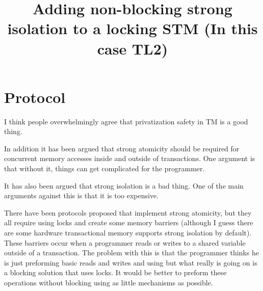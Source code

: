 \documentclass[11pt]{article}
\begin{document}
\newenvironment{theorem-repeat}[1]{\begin{trivlist}
\item[\hspace{\labelsep}{\bf\noindent Theorem~\ref{#1} }]}%
{\end{trivlist}}

\newenvironment{corollary-repeat}[1]{\begin{trivlist}
\item[\hspace{\labelsep}{\bf\noindent Corollary~\ref{#1} }]}%
{\end{trivlist}}


\newcommand{\Xomit}[1]{}

\title{Adding non-blocking strong isolation to a locking STM (In this case TL2)}
\maketitle

\section{Protocol}
I think people overwhelmingly agree that privatization safety in TM is a good thing.

In addition it has been argued that strong atomicity should be required for concurrent memory accesses inside and outside of transactions.
One argument is that without it, things can get complicated for the programmer.

It has also been argued that strong isolation is a bad thing.
One of the main arguments against this is that it is too expensive.

There have been protocols proposed that implement strong atomicity, but they all require using locks
and create some memory barriers
(although I guess there are some hardware transactional memory supports strong isolation by default).
These barriers occur when a programmer reads or writes to a shared variable outside of a transaction.
The problem with this is that the programmer thinks he is just preforming basic reads and writes and using
but what really is going on is a blocking solution that uses locks.
It would be better to preform these operations without blocking using as little mechanisms as possible.
\end{document}
